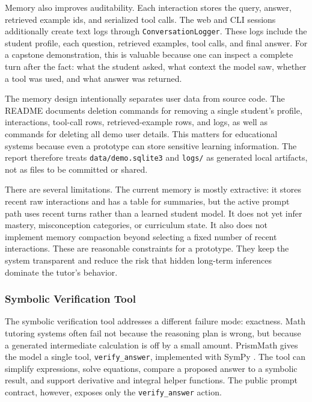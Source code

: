 Memory also improves auditability. Each interaction stores the query, answer, retrieved example ids, and serialized tool calls. The web and CLI sessions additionally create text logs through \texttt{ConversationLogger}. These logs include the student profile, each question, retrieved examples, tool calls, and final answer. For a capstone demonstration, this is valuable because one can inspect a complete turn after the fact: what the student asked, what context the model saw, whether a tool was used, and what answer was returned.

The memory design intentionally separates user data from source code. The README documents deletion commands for removing a single student's profile, interactions, tool-call rows, retrieved-example rows, and logs, as well as commands for deleting all demo user details. This matters for educational systems because even a prototype can store sensitive learning information. The report therefore treats \texttt{data/demo.sqlite3} and \texttt{logs/} as generated local artifacts, not as files to be committed or shared.

There are several limitations. The current memory is mostly extractive: it stores recent raw interactions and has a table for summaries, but the active prompt path uses recent turns rather than a learned student model. It does not yet infer mastery, misconception categories, or curriculum state. It also does not implement memory compaction beyond selecting a fixed number of recent interactions. These are reasonable constraints for a prototype. They keep the system transparent and reduce the risk that hidden long-term inferences dominate the tutor's behavior.

\subsubsection{Symbolic Verification Tool}

The symbolic verification tool addresses a different failure mode: exactness. Math tutoring systems often fail not because the reasoning plan is wrong, but because a generated intermediate calculation is off by a small amount. PrismMath gives the model a single tool, \texttt{verify\_answer}, implemented with SymPy \citep{meurer2017sympy}. The tool can simplify expressions, solve equations, compare a proposed answer to a symbolic result, and support derivative and integral helper functions. The public prompt contract, however, exposes only the \texttt{verify\_answer} action.

